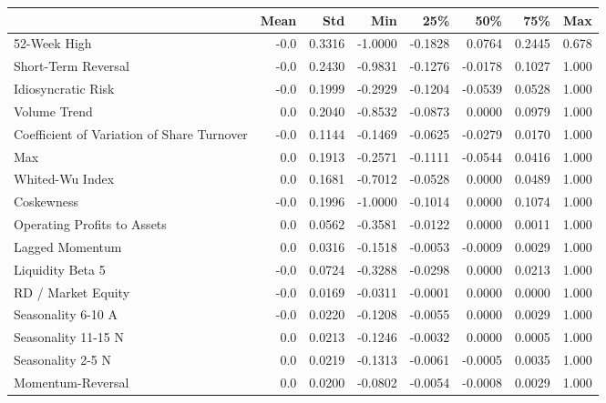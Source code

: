 \begin{tabular}{lrrrrrrr}
\toprule
{} &  Mean &     Std &     Min &     25\% &     50\% &     75\% &    Max \\
\midrule
52-Week High                               &  -0.0 &  0.3316 & -1.0000 & -0.1828 &  0.0764 &  0.2445 &  0.678 \\
Short-Term Reversal                        &  -0.0 &  0.2430 & -0.9831 & -0.1276 & -0.0178 &  0.1027 &  1.000 \\
Idiosyncratic Risk                         &  -0.0 &  0.1999 & -0.2929 & -0.1204 & -0.0539 &  0.0528 &  1.000 \\
Volume Trend                               &   0.0 &  0.2040 & -0.8532 & -0.0873 &  0.0000 &  0.0979 &  1.000 \\
Coefficient of Variation of Share Turnover &  -0.0 &  0.1144 & -0.1469 & -0.0625 & -0.0279 &  0.0170 &  1.000 \\
Max                                        &   0.0 &  0.1913 & -0.2571 & -0.1111 & -0.0544 &  0.0416 &  1.000 \\
Whited-Wu Index                            &   0.0 &  0.1681 & -0.7012 & -0.0528 &  0.0000 &  0.0489 &  1.000 \\
Coskewness                                 &  -0.0 &  0.1996 & -1.0000 & -0.1014 &  0.0000 &  0.1074 &  1.000 \\
Operating Profits to Assets                &   0.0 &  0.0562 & -0.3581 & -0.0122 &  0.0000 &  0.0011 &  1.000 \\
Lagged Momentum                            &   0.0 &  0.0316 & -0.1518 & -0.0053 & -0.0009 &  0.0029 &  1.000 \\
Liquidity Beta 5                           &  -0.0 &  0.0724 & -0.3288 & -0.0298 &  0.0000 &  0.0213 &  1.000 \\
RD / Market Equity                         &  -0.0 &  0.0169 & -0.0311 & -0.0001 &  0.0000 &  0.0000 &  1.000 \\
Seasonality 6-10 A                         &  -0.0 &  0.0220 & -0.1208 & -0.0055 &  0.0000 &  0.0029 &  1.000 \\
Seasonality 11-15 N                        &   0.0 &  0.0213 & -0.1246 & -0.0032 &  0.0000 &  0.0005 &  1.000 \\
Seasonality 2-5 N                          &   0.0 &  0.0219 & -0.1313 & -0.0061 & -0.0005 &  0.0035 &  1.000 \\
Momentum-Reversal                          &   0.0 &  0.0200 & -0.0802 & -0.0054 & -0.0008 &  0.0029 &  1.000 \\

\end{tabular}
